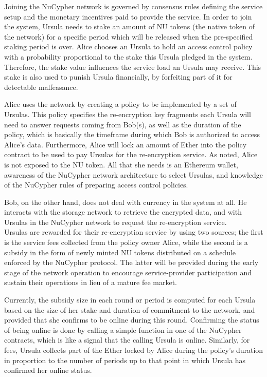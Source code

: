 \documentclass{llncs}
\begin{document}
Joining the NuCypher network is governed by consensus rules defining the service setup
and the monetary incentives paid to provide the service. In order to join the 
system, Ursula needs to stake an amount of NU tokens (the native token of the network) for a specific period
which will be released when the pre-specified staking period is over. Alice chooses an
Ursula to hold an access control policy with a probability proportional to the stake this Ursula 
pledged in the system. Therefore, the stake value influences the service load an Ursula
may receive. This stake is also used to punish Ursula financially, by forfeiting part
of it for detectable malfeasance.


Alice uses the network by creating a policy to be implemented by a
set of Ursulas. This policy specifies the re-encryption key fragments each Ursula will
need to answer requests coming from Bob(s), as well as the duration of the policy, which 
is basically the timeframe during which Bob is authorized to access Alice's data.  Furthermore,
Alice will lock an amount of Ether into the policy contract to be used to pay Ursulas for the re-encryption 
service. As noted, Alice is not exposed to the NU token. All that she needs is an Ethereum
wallet, awareness of the NuCypher network architecture to select Ursulas, and knowledge of the
NuCypher rules of preparing access control policies.


Bob, on the other hand, does not deal with currency in the system at all. He interacts with the storage 
network to retrieve the encrypted data, and with Ursulas in the NuCypher network to request the
re-encryption service. \\


 Ursulas are rewarded for their re-encryption service by using two sources; the first is the service fees collected from the policy owner Alice, while the second is a subsidy in the form of newly minted NU tokens distributed on a schedule enforced by the NuCypher protocol. The latter will be provided during the early stage of the network operation to encourage service-provider participation and sustain their operations in lieu of a mature fee market.

Currently, the subsidy size in each round or period is computed for each Ursula based on the size of her stake and duration of commitment to the network, and provided that she confirms to be online during this round. Confirming the status of being online is done by calling a simple function in one of the NuCypher contracts, which is like a signal that the calling Ursula is online. Similarly, for fees, Ursula collects part of the Ether locked by Alice during the policy's duration in proportion to the number of periods up to that point in which Ursula has confirmed her online status.
\end{document}
